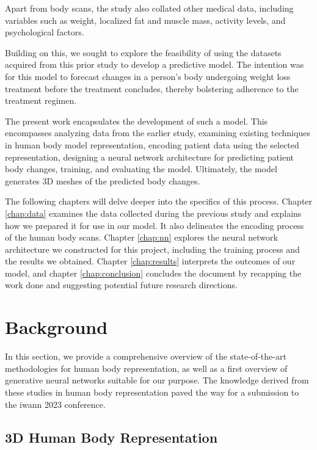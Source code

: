 Apart from body scans, the study also collated other medical data, including
variables such as weight, localized fat and muscle mass, activity levels, and
psychological factors.

Building on this, we sought to explore the feasibility of using the datasets
acquired from this prior study to develop a predictive model. The intention was
for this model to forecast changes in a person's body undergoing weight loss
treatment before the treatment concludes, thereby bolstering adherence to the
treatment regimen.

The present work encapsulates the development of such a model. This encompasses
analyzing data from the earlier study, examining existing techniques in human
body model representation, encoding patient data using the selected
representation, designing a neural network architecture for predicting patient
body changes, training, and evaluating the model. Ultimately, the model
generates 3D meshes of the predicted body changes.

The following chapters will delve deeper into the specifics of this process.
Chapter \ref{chap:data} examines the data collected during the previous study
and explains how we prepared it for use in our model. It also delineates the
encoding process of the human body scans. Chapter \ref{chap:nn} explores the
neural network architecture we constructed for this project, including the
training process and the results we obtained. Chapter \ref{chap:results}
interprets the outcomes of our model, and chapter \ref{chap:conclusion}
concludes the document by recapping the work done and suggesting potential
future research directions.

\section{Background}\label{sec:background}

In this section, we provide a comprehensive overview of the state-of-the-art
methodologies for human body representation, as well as a first overview of
generative neural networks suitable for our purpose. The knowledge derived from
these studies in human body representation paved the way for a submission to
the \gls{iwann} 2023 conference. 

\subsection{3D Human Body Representation}

